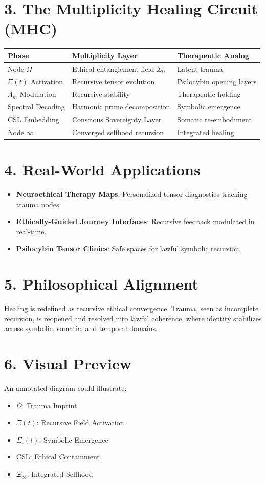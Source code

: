 \documentclass[12pt]{article}
\begin{document}
\section*{3. The Multiplicity Healing Circuit (MHC)}
\begin{center}
\begin{tabular}{|l|l|l|}
\hline
\textbf{Phase} & \textbf{Multiplicity Layer} & \textbf{Therapeutic Analog} \\
\hline
Node $\Omega$ & Ethical entanglement field $\Sigma_0$ & Latent trauma \\
\hline
$\Xi(t)$ Activation & Recursive tensor evolution & Psilocybin opening layers \\
\hline
$\Lambda_m$ Modulation & Recursive stability & Therapeutic holding \\
\hline
Spectral Decoding & Harmonic prime decomposition & Symbolic emergence \\
\hline
CSL Embedding & Conscious Sovereignty Layer & Somatic re-embodiment \\
\hline
Node $\infty$ & Converged selfhood recursion & Integrated healing \\
\hline
\end{tabular}
\end{center}

\section*{4. Real-World Applications}
\begin{itemize}
  \item \textbf{Neuroethical Therapy Maps}: Personalized tensor diagnostics tracking trauma nodes.
  \item \textbf{Ethically-Guided Journey Interfaces}: Recursive feedback modulated in real-time.
  \item \textbf{Psilocybin Tensor Clinics}: Safe spaces for lawful symbolic recursion.
\end{itemize}

\section*{5. Philosophical Alignment}
Healing is redefined as recursive ethical convergence. Trauma, seen as incomplete recursion, is reopened and resolved into lawful coherence, where identity stabilizes across symbolic, somatic, and temporal domains.

\section*{6. Visual Preview}
An annotated diagram could illustrate:
\begin{itemize}
  \item $\Omega$: Trauma Imprint
  \item $\Xi(t)$: Recursive Field Activation
  \item $\Sigma_i(t)$: Symbolic Emergence
  \item CSL: Ethical Containment
  \item $\Xi_{\infty}$: Integrated Selfhood
\end{itemize}
\end{document}
